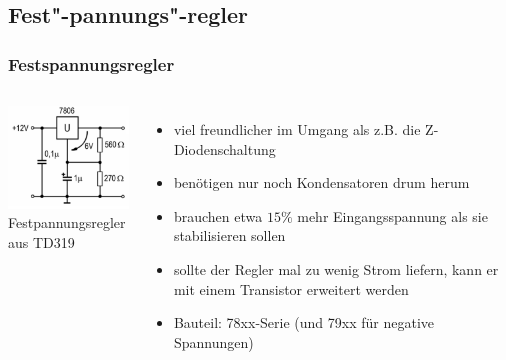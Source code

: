 \subsection*{Fest"-pannungs"-regler}
\begin{frame}
  \frametitle{Festspannungsregler}
  \begin{columns}
      \includegraphics[width=1\textwidth,height=.8\textheight,keepaspectratio]{a17/TD319.png}\\
      {\tiny Festpannungsregler aus TD319 \hyperlink{refs}{\cite{bna}}}
    \begin{itemize}
      \item viel freundlicher im Umgang als z.B. die Z-Diodenschaltung
      \item benötigen nur noch Kondensatoren drum herum
      \item brauchen etwa $15\%$ mehr Eingangsspannung als sie stabilisieren sollen
      \item sollte der Regler mal zu wenig Strom liefern, kann er mit einem Transistor erweitert werden
      \item Bauteil: 78xx-Serie (und 79xx für negative Spannungen)
    \end{itemize}
  \end{columns}
\end{frame}

